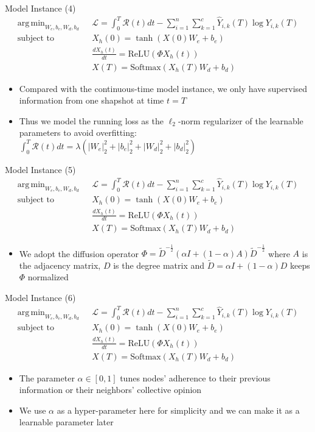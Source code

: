 \documentclass{beamer}
\DeclareMathOperator*{\argmin}{arg\,min}
\begin{document}
\begin{frame}{Model Instance (4)}\[
\begin{split}
\argmin_{W_e,b_e,W_d,b_d}\text{ }&\mathcal{L}=\int_0^T\mathcal{R}(t)dt-\sum_{i=1}^n\sum_{k=1}^c\hat{Y}_{i,k}(T)\log Y_{i,k}(T)\\
\text{subject to }&X_h(0)=\tanh(X(0)W_e+b_e)\\
&\frac{dX_h(t)}{dt}=\text{ReLU}(\Phi X_h(t))\\
&X(T)=\text{Softmax}(X_h(T)W_d+b_d)
\end{split}
\]
\begin{itemize}
\item Compared with the continuous-time model instance, we only have supervised information from one shapshot at time $t=T$
\item Thus we model the running loss as the $\ell_2$-norm regularizer of the learnable parameters to avoid overfitting: $\int_0^T\mathcal{R}(t)dt=\lambda(|W_e|_2^2+|b_e|_2^2+|W_d|_2^2+|b_d|_2^2)$
\end{itemize}
\end{frame}


\begin{frame}{Model Instance (5)}\[
\begin{split}
\argmin_{W_e,b_e,W_d,b_d}\text{ }&\mathcal{L}=\int_0^T\mathcal{R}(t)dt-\sum_{i=1}^n\sum_{k=1}^c\hat{Y}_{i,k}(T)\log Y_{i,k}(T)\\
\text{subject to }&X_h(0)=\tanh(X(0)W_e+b_e)\\
&\frac{dX_h(t)}{dt}=\text{ReLU}(\Phi X_h(t))\\
&X(T)=\text{Softmax}(X_h(T)W_d+b_d)
\end{split}
\]
\begin{itemize}
\item We adopt the diffusion operator $\Phi=\tilde{D}^{-\frac{1}{2}}(\alpha I+(1-\alpha)A)\tilde{D}^{-\frac{1}{2}}$ where $A$ is the adjacency matrix, $D$ is the degree matrix and $\tilde{D}=\alpha I+(1-\alpha)D$ keeps $\Phi$ normalized
\end{itemize}
\end{frame}


\begin{frame}{Model Instance (6)}\[
\begin{split}
\argmin_{W_e,b_e,W_d,b_d}\text{ }&\mathcal{L}=\int_0^T\mathcal{R}(t)dt-\sum_{i=1}^n\sum_{k=1}^c\hat{Y}_{i,k}(T)\log Y_{i,k}(T)\\
\text{subject to }&X_h(0)=\tanh(X(0)W_e+b_e)\\
&\frac{dX_h(t)}{dt}=\text{ReLU}(\Phi X_h(t))\\
&X(T)=\text{Softmax}(X_h(T)W_d+b_d)
\end{split}
\]
\begin{itemize}
\item The parameter $\alpha\in[0,1]$ tunes nodes' adherence to their previous information or their neighbors' collective opinion
\item We use $\alpha$ as a hyper-parameter here for simplicity and we can make it as a learnable parameter later
\end{itemize}
\end{frame}
\end{document}
